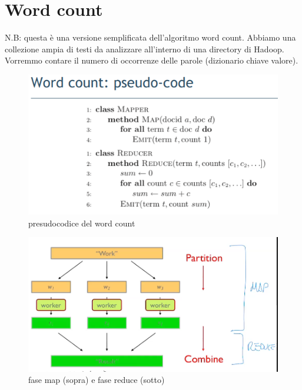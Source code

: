 \documentclass[italian,10pt,a4paper]{report}
\begin{document}
	\section{Word count}
	N.B: questa è una versione semplificata dell'algoritmo word count.
	Abbiamo una collezione ampia di testi da analizzare all'interno di una directory di Hadoop. Vorremmo contare il numero di occorrenze delle parole (dizionario chiave valore). 
	\begin{figure}
		\centering
		\includegraphics[width=0.7\linewidth]{img/pseudocodice-word-count}
		\caption{presudocodice del word count}
		\label{fig:pseudocodice-word-count}
	\end{figure}
	\begin{figure}
		\centering
		\includegraphics[width=0.7\linewidth]{img/divide-and-conquer}
		\caption{fase map (sopra) e fase reduce (sotto)}
		\label{fig:divide-and-conquer}
	\end{figure}
	
\end{document}
